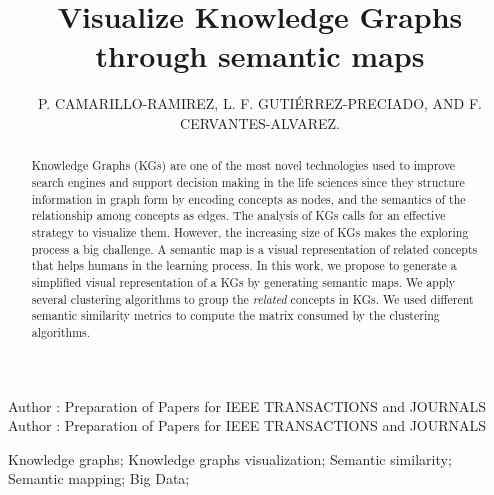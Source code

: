 \documentclass{ieeeaccess}
\begin{document}

\title{Visualize Knowledge Graphs through semantic maps}
\author{\uppercase{P. Camarillo-Ramirez},
\uppercase{L. F. Guti\'{e}rrez-Preciado, and F. Cervantes-Alvarez}.}
\address[1]{Western Institute of Technology and Higher Education, Tlaquepaque, Jalisco 45601 Mexico (pablo.camarillo@iteso.mx;lgutierrez@iteso.mx;fcervantes@iteso.mx)}


\markboth
{Author \headeretal: Preparation of Papers for IEEE TRANSACTIONS and JOURNALS}
{Author \headeretal: Preparation of Papers for IEEE TRANSACTIONS and JOURNALS}


\graphicspath{ {img/} }

\begin{abstract}
Knowledge Graphs (KGs) are one of the most novel technologies used to
improve search engines and support
decision making in the life sciences since they structure information in graph form
by encoding concepts as nodes, and the semantics of the relationship
among concepts as edges. The analysis of KGs calls
for an effective strategy to visualize them. However, the increasing
size of KGs makes the exploring process a big challenge.
A semantic map is a visual representation of related concepts that helps humans
in the learning process. In this work, we propose to generate a simplified visual
representation of a KGs by generating semantic maps. We apply several clustering 
algorithms to group the \textit{related} concepts in KGs. We used different semantic similarity
metrics to compute the matrix consumed by the clustering algorithms.

\end{abstract}

\begin{keywords}
Knowledge graphs; Knowledge graphs visualization; Semantic similarity; Semantic mapping; Big Data;
\end{keywords}

\titlepgskip=-15pt

\maketitle
\end{document}
